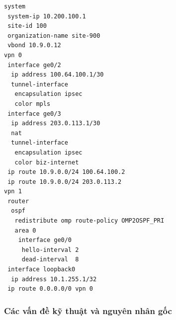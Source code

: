 \begin{lstlisting}[style=customcode,caption={Trích cấu hình vEdge1-S100},label={lst:vedge_ch4}]
system
 system-ip 10.200.100.1
 site-id 100
 organization-name site-900
 vbond 10.9.0.12
vpn 0
 interface ge0/2
  ip address 100.64.100.1/30
  tunnel-interface
   encapsulation ipsec
   color mpls
 interface ge0/3
  ip address 203.0.113.1/30
  nat
  tunnel-interface
   encapsulation ipsec
   color biz-internet
 ip route 10.9.0.0/24 100.64.100.2
 ip route 10.9.0.0/24 203.0.113.2
vpn 1
 router
  ospf
   redistribute omp route-policy OMP2OSPF_PRI
   area 0
    interface ge0/0
     hello-interval 2
     dead-interval  8
 interface loopback0
  ip address 10.1.255.1/32
 ip route 0.0.0.0/0 vpn 0
\end{lstlisting}

\subsubsection{Các vấn đề kỹ thuật và nguyên nhân gốc}

